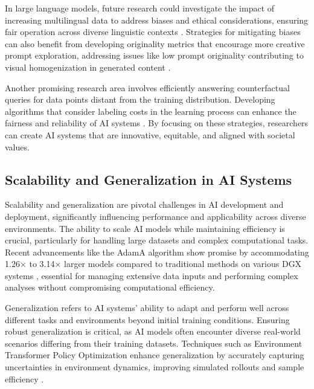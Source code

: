 In large language models, future research could investigate the impact of increasing multilingual data to address biases and ethical considerations, ensuring fair operation across diverse linguistic contexts \cite{chowdhery2023palm}. Strategies for mitigating biases can also benefit from developing originality metrics that encourage more creative prompt exploration, addressing issues like low prompt originality contributing to visual homogenization in generated content \cite{palmini2024patternscreativityuserinput}.

Another promising research area involves efficiently answering counterfactual queries for data points distant from the training distribution. Developing algorithms that consider labeling costs in the learning process can enhance the fairness and reliability of AI systems \cite{sen2018supervisingfeatureinfluence}. By focusing on these strategies, researchers can create AI systems that are innovative, equitable, and aligned with societal values.

\subsection{Scalability and Generalization in AI Systems} \label{subsec:Scalability and Generalization in AI Systems}

Scalability and generalization are pivotal challenges in AI development and deployment, significantly influencing performance and applicability across diverse environments. The ability to scale AI models while maintaining efficiency is crucial, particularly for handling large datasets and complex computational tasks. Recent advancements like the AdamA algorithm show promise by accommodating 1.26× to 3.14× larger models compared to traditional methods on various DGX systems \cite{zhang2023adamaccumulationreducememory}, essential for managing extensive data inputs and performing complex analyses without compromising computational efficiency.

Generalization refers to AI systems' ability to adapt and perform well across different tasks and environments beyond initial training conditions. Ensuring robust generalization is critical, as AI models often encounter diverse real-world scenarios differing from their training datasets. Techniques such as Environment Transformer Policy Optimization enhance generalization by accurately capturing uncertainties in environment dynamics, improving simulated rollouts and sample efficiency \cite{wang2023environmenttransformerpolicyoptimization}.

